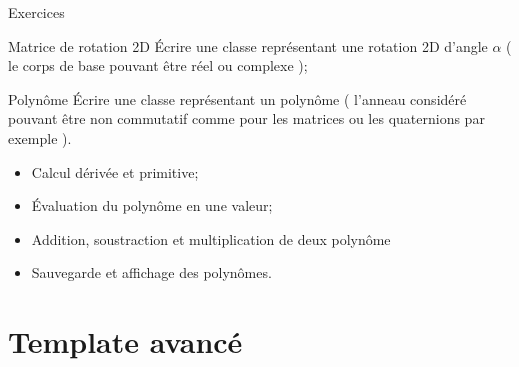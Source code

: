 \documentclass[handout,10pt]{beamer}
\begin{document}
\begin{frame}[fragile]{Exercices}
\scriptsize
\begin{exampleblock}{Matrice de rotation 2D}
\'Ecrire une classe représentant une rotation 2D d'angle $\alpha$ ( le corps de base pouvant être réel ou complexe );
\end{exampleblock}

\begin{exampleblock}{Polynôme}
Écrire une classe représentant un polynôme ( l'anneau considéré pouvant être non commutatif comme pour les matrices ou les quaternions par exemple ).
\begin{itemize}
\item Calcul dérivée et primitive;
\item Évaluation du polynôme en une valeur;
\item Addition, soustraction et multiplication de deux polynôme
\item Sauvegarde et affichage des polynômes.
\end{itemize}
\end{exampleblock}
\end{frame}

\section{Template avancé}
\end{document}
